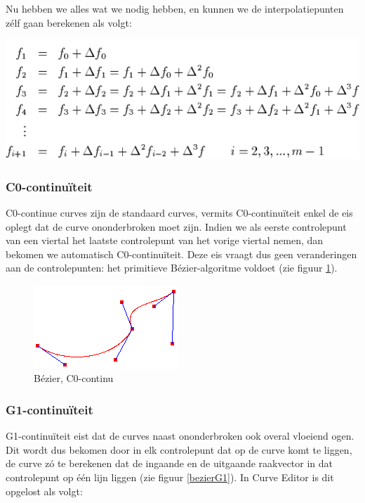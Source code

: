 \documentclass[a4paper,11pt,oneside, titlepage]{article}
\begin{document}
Nu hebben we alles wat we nodig hebben, en kunnen we de interpolatiepunten z\'elf gaan berekenen als volgt:
\begin{center}
\includegraphics[scale=0.6]{diff6.png}
\end{center}
\subsubsection{C0-continu\"iteit \label{sc0}}
C0-continue curves zijn de standaard curves, vermits C0-continu\"iteit enkel de eis oplegt dat de curve ononderbroken moet zijn.
Indien we als eerste controlepunt van een viertal het laatste controlepunt van het vorige viertal nemen, dan bekomen we automatisch C0-continu\"iteit. Deze eis vraagt dus geen veranderingen aan de controlepunten: het primitieve
B\'ezier-algoritme voldoet (zie figuur \ref{bezierC0}).
\begin{figure}
\begin{center}
\includegraphics[scale=0.4]{./screenies2/bezierC0.png}
\caption{B\'ezier, C0-continu}\label{bezierC0}
\end{center}
\end{figure}
\subsubsection{G1-continu\"iteit \label{sG1}}
G1-continu\"iteit eist dat de curves naast ononderbroken ook overal vloeiend ogen. Dit wordt dus bekomen door in elk controlepunt dat op de curve komt te liggen, de curve z\'o te berekenen dat de ingaande en de uitgaande raakvector
in dat controlepunt op \'e\'en lijn liggen (zie figuur \ref{bezierG1}). In Curve Editor is dit opgelost als volgt:
\end{document}
